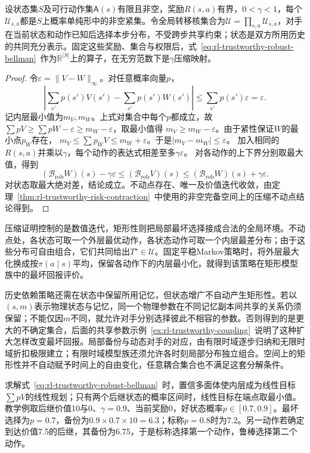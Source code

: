 \begin{theorem}[矩形鲁棒Bellman算子的压缩性]
  \label{thm:rl-trustworthy-robust-contraction}
  设状态集$S$及可行动作集$\mathsf A(s)$有限且非空，奖励$R(s,a)$有界，$0<\gamma<1$，每个$\mathcal U_{s,a}$都是$S$上概率单纯形中的非空紧集。令全局转移核集合为$\mathcal U=\prod_{s,a}\mathcal U_{s,a}$，对手在当前状态和动作已知后选择本步分布，不受跨步共享约束；状态是双方所用历史的共同充分表示。固定这些奖励、集合与权限后，式~\eqref{eq:rl-trustworthy-robust-bellman}~作为$\mathbb R^{|S|}$上的算子，在无穷范数下是$\gamma$压缩映射。
\end{theorem}
\begin{proof}
  令$\varepsilon=\lVert V-W\rVert_\infty$。对任意概率向量$p$，
  \[
    \left|\sum_{s'}p(s')V(s')-\sum_{s'}p(s')W(s')\right|
      \leq\sum_{s'}p(s')\varepsilon=\varepsilon.
  \]
  记内层最小值为$m_V,m_W$。上式对集合中每个$p$都成立，故
  $\sum pV\geq\sum pW-\varepsilon\geq m_W-\varepsilon$，取最小值得
  $m_V\geq m_W-\varepsilon$。由于紧性保证$W$的最小点$p_W$存在，
  $m_V\leq\sum p_WV\leq m_W+\varepsilon$。于是$|m_V-m_W|\leq\varepsilon$。
  加入相同的$R(s,a)$并乘以$\gamma$，每个动作的表达式相差至多$\gamma\varepsilon$。
  对各动作的上下界分别取最大值，得到
  \[
    (\mathcal B_{\mathrm{rob}}W)(s)-\gamma\varepsilon
      \leq(\mathcal B_{\mathrm{rob}}V)(s)
      \leq(\mathcal B_{\mathrm{rob}}W)(s)+\gamma\varepsilon.
  \]
  对状态取最大绝对差，结论成立。不动点存在、唯一及价值迭代收敛，由定理~\ref{thm:rl-trustworthy-risk-contraction}~中使用的非空完备空间上的压缩不动点结论得到。
\end{proof}

压缩证明控制的是数值迭代，矩形性则把局部最坏选择接成合法的全局环境。不动点处，各状态可取一个外层最优动作，各状态动作可取一个内层最差分布；由于这些分布可自由组合，它们共同给出$T^\star\in\mathcal U$。固定平稳Markov策略时，将外层最大化换成按$\pi(a\mid s)$平均，保留各动作下的内层最小化，就得到该策略在矩形模型族中的最坏回报评价。

历史依赖策略还需在状态中保留所用记忆，但状态增广不自动产生矩形性。若以$(s,m)$表示物理状态与记忆，同一个物理参数在不同记忆副本间共享的关系仍须保留；不能仅因$m$不同，就允许对手分别选择彼此不相容的参数。否则得到的是更大的不确定集合，后面的共享参数示例~\ref{ex:rl-trustworthy-coupling}~说明了这种扩大怎样改变最坏回报。局部备份与动态对手的对应，由有限时域逐步归纳和无限时域折扣极限建立；有限时域模型族还须允许各时刻局部分布独立组合。空间上的矩形性并不自动赋予时间上的自由变化，任意耦合集合也不满足这套分解条件。

求解式~\eqref{eq:rl-trustworthy-robust-bellman}~时，置信多面体使内层成为线性目标$\sum pV$的线性规划；只有两个后继状态的概率区间时，线性目标在端点取最小值。教学例取后继价值10与0、$\gamma=0.9$、当前奖励0，好状态概率$p\in[0.7,0.9]$。最坏选择为$p=0.7$，备份为$0.9\times0.7\times10=6.3$；标称$p=0.8$时为7.2。另一动作若确定到达价值7.5的后继，其备份为6.75，于是标称选择第一个动作，鲁棒选择第二个动作。

